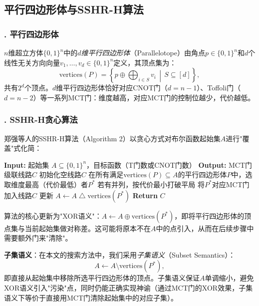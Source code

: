 \documentclass[10.5pt,compsoc,UTF8]{CjC}
\theoremstyle{mystyle}
\begin{document}
\subsection{\heiti 平行四边形体与SSHR-H算法}

\subsubsection*{. 平行四边形体}

$n$维超立方体$\{0,1\}^n$中的\emph{$d$维平行四边形体}（Parallelotope）由角点$p\in\{0,1\}^n$和$d$个线性无关方向向量$v_1,\ldots,v_d\in\{0,1\}^n$定义，其顶点集为：
\begin{equation}
    \text{vertices}(P) = \left\{p \oplus \bigoplus_{i\in S} v_i \,\middle|\, S\subseteq[d]\right\},
\end{equation}
共有$2^d$个顶点。$d$维平行四边形体恰好对应$\text{CNOT}$门（$d=n-1$）、Toffoli门（$d=n-2$）等一系列MCT门：维度越高，对应MCT门的控制位越少，代价越低。

\subsubsection*{. SSHR-H贪心算法}

郑强等人\cite{zheng2025cnot}的SSHR-H算法（Algorithm 2）以贪心方式对布尔函数起始集$A$进行"覆盖"式化简：

\begin{algorithm}[H]
\caption{SSHR-H贪心算法（原文Algorithm 2）}
\begin{algorithmic}[1]
\State \textbf{Input:} 起始集 $A\subseteq\{0,1\}^n$，目标函数（T门数或CNOT门数）
\State \textbf{Output:} MCT门级联线路$C$
\State 初始化空线路$C$
    \State 在所有满足$\text{vertices}(P)\subseteq A$的平行四边形体$P$中，选取维度最高（代价最低）者$P^*$
    \State 若有并列，按代价最小打破平局
    \State 将$P^*$对应MCT门加入线路$C$
    \State 更新 $A \gets A \;\triangle\; \text{vertices}(P^*)$  
\EndWhile
\State \textbf{Return} $C$
\end{algorithmic}
\end{algorithm}

算法的核心更新为"XOR语义"：$A \gets A \oplus \text{vertices}(P^*)$，即将平行四边形体的顶点集与当前起始集做对称差。这可能将原本不在$A$中的点引入，从而在后续步骤中需要额外门来"清除"。

\textbf{子集语义}：在本文的搜索方法中，我们采用\emph{子集语义}（Subset Semantics）：
\begin{equation}
    A \gets A \setminus \text{vertices}(P^*),
\end{equation}
即直接从起始集中移除所选平行四边形体的顶点。子集语义保证$A$单调缩小，避免XOR语义引入"污染"点，同时仍能正确实现神谕（通过MCT门的XOR效果，子集语义下等价于直接用MCT门清除起始集中的对应子集）。
\end{document}

